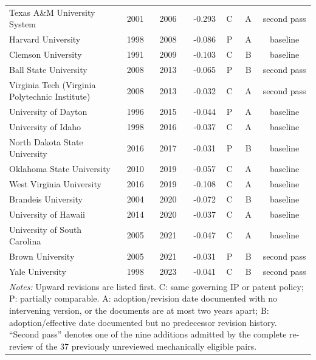{\begin{longtable}{p{5.5cm}rrrccc}
Texas A\&M University System & 2001 & 2006 & -0.293 & C & A & second pass \\
Harvard University & 1998 & 2008 & -0.086 & P & A & baseline \\
Clemson University & 1991 & 2009 & -0.103 & C & B & baseline \\
Ball State University & 2008 & 2013 & -0.065 & P & B & second pass \\
Virginia Tech (Virginia Polytechnic Institute) & 2008 & 2013 & -0.032 & C & A & second pass \\
University of Dayton & 1996 & 2015 & -0.044 & P & A & baseline \\
University of Idaho & 1998 & 2016 & -0.037 & C & A & baseline \\
North Dakota State University & 2016 & 2017 & -0.031 & P & B & baseline \\
Oklahoma State University & 2010 & 2019 & -0.057 & C & A & baseline \\
West Virginia University & 2016 & 2019 & -0.108 & C & A & baseline \\
Brandeis University & 2004 & 2020 & -0.072 & C & B & baseline \\
University of Hawaii & 2014 & 2020 & -0.037 & C & A & baseline \\
University of South Carolina & 2005 & 2021 & -0.047 & C & A & baseline \\
Brown University & 2005 & 2021 & -0.031 & P & B & second pass \\
Yale University & 1998 & 2023 & -0.041 & C & B & second pass \\
\bottomrule
\multicolumn{7}{p{15.2cm}}{\footnotesize\textit{Notes:} Upward revisions are listed first. C: same governing IP or
patent policy; P: partially comparable. A: adoption/revision date documented with no intervening version, or the documents
are at most two years apart; B: adoption/effective date documented but no predecessor revision history. ``Second pass''
denotes one of the nine additions admitted by the complete re-review of the 37 previously unreviewed mechanically eligible
pairs.}
\end{longtable}
}

